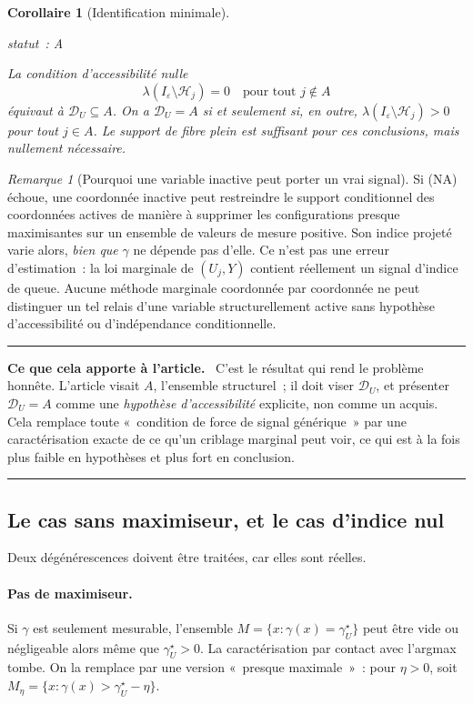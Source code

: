 \documentclass[11pt]{article}
\theoremstyle{plain}
\newtheorem{corollaire}[theoreme]{Corollaire}
\theoremstyle{definition}
\theoremstyle{remark}
\newtheorem{remarque}[theoreme]{Remarque}
\newcommand{\1}{\mathbf 1}
\newcommand{\I}{I_\varepsilon}
\newcommand{\D}{\mathcal D_U}
\newcommand{\gU}{\gamma^\star_U}
\newcommand{\statut}[1]{%
  \nopagebreak\par\nopagebreak
  \hfill{\normalfont\footnotesize\textcolor{gris}{statut~: #1}}%
  \par\nopagebreak\vspace{-2pt}}
\newenvironment{apport}
  {\par\medskip\noindent\begingroup\color{bleu}\rule{\linewidth}{0.6pt}\par
   \nobreak\vspace{2pt}\noindent\textbf{Ce que cela apporte à l'article.}\ \normalcolor}
  {\par\vspace{2pt}\noindent\textcolor{bleu}{\rule{\linewidth}{0.6pt}}\endgroup\par\medskip}
\begin{document}
\begin{corollaire}[Identification minimale]
\label{cor:identification}
\statut{A}
La condition d'\emph{accessibilité nulle}
\[
 \lambda(\I\setminus\mathcal H_j)=0\quad\text{pour tout }j\notin A
 \tag{NA}
\]
équivaut à $\D\subseteq A$. On a $\D=A$ si et seulement si, en outre,
$\lambda(\I\setminus\mathcal H_j)>0$ pour tout $j\in A$. Le support de
fibre plein est \emph{suffisant} pour ces conclusions, mais nullement
nécessaire.
\end{corollaire}

\begin{remarque}[Pourquoi une variable inactive peut porter un vrai signal]
Si (NA) échoue, une coordonnée inactive peut restreindre le support
conditionnel des coordonnées actives de manière à supprimer les
configurations presque maximisantes sur un ensemble de valeurs de mesure
positive. Son indice projeté varie alors, \emph{bien que} $\gamma$ ne
dépende pas d'elle. Ce n'est pas une erreur d'estimation~: la loi
marginale de $(U_j,Y)$ contient réellement un signal d'indice de queue.
Aucune méthode marginale coordonnée par coordonnée ne peut distinguer un
tel relais d'une variable structurellement active sans hypothèse
d'accessibilité ou d'indépendance conditionnelle.
\end{remarque}

\begin{apport}
C'est le résultat qui rend le problème honnête. L'article visait $A$,
l'ensemble structurel~; il doit viser $\D$, et présenter
$\D=A$ comme une \emph{hypothèse d'accessibilité} explicite, non comme un
acquis. Cela remplace toute «~condition de force de signal générique~» par
une caractérisation exacte de ce qu'un criblage marginal peut voir, ce qui
est à la fois plus faible en hypothèses et plus fort en conclusion.
\end{apport}

\subsection{Le cas sans maximiseur, et le cas d'indice nul}

Deux dégénérescences doivent être traitées, car elles sont réelles.

\paragraph{Pas de maximiseur.} Si $\gamma$ est seulement mesurable,
l'ensemble $M=\{x:\gamma(x)=\gU\}$ peut être vide ou négligeable alors
même que $\gU>0$. La caractérisation par contact avec l'argmax tombe. On
la remplace par une version «~presque maximale~»~: pour $\eta>0$, soit
$M_\eta=\{x:\gamma(x)>\gU-\eta\}$.
\end{document}
